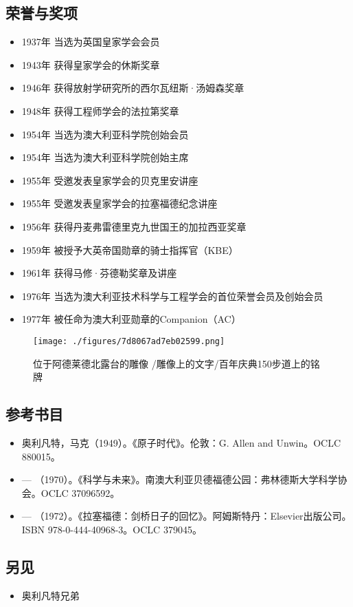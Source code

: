\subsection{荣誉与奖项}
\begin{itemize}
\item 1937年 当选为英国皇家学会会员
\item 1943年 获得皇家学会的休斯奖章
\item 1946年 获得放射学研究所的西尔瓦纽斯·汤姆森奖章
\item 1948年 获得工程师学会的法拉第奖章
\item 1954年 当选为澳大利亚科学院创始会员
\item 1954年 当选为澳大利亚科学院创始主席
\item 1955年 受邀发表皇家学会的贝克里安讲座
\item 1955年 受邀发表皇家学会的拉塞福德纪念讲座
\item 1956年 获得丹麦弗雷德里克九世国王的加拉西亚奖章
\item 1959年 被授予大英帝国勋章的骑士指挥官（KBE）
\item 1961年 获得马修·芬德勒奖章及讲座
\item 1976年 当选为澳大利亚技术科学与工程学会的首位荣誉会员及创始会员
\item 1977年 被任命为澳大利亚勋章的Companion（AC）
\end{itemize}
\begin{figure}[ht]
\centering
\texttt{[image: ./figures/7d8067ad7eb02599.png]}
\caption{位于阿德莱德北露台的雕像 /雕像上的文字/百年庆典150步道上的铭牌} \label{fig_MKalft_11}
\end{figure}
\subsection{参考书目}
\begin{itemize}
\item 奥利凡特，马克（1949）。《原子时代》。伦敦：G. Allen and Unwin。OCLC 880015。
\item — （1970）。《科学与未来》。南澳大利亚贝德福德公园：弗林德斯大学科学协会。OCLC 37096592。
\item — （1972）。《拉塞福德：剑桥日子的回忆》。阿姆斯特丹：Elsevier出版公司。ISBN 978-0-444-40968-3。OCLC 379045。
\end{itemize}
\subsection{另见}
\begin{itemize}
\item 奥利凡特兄弟
\end{itemize}
